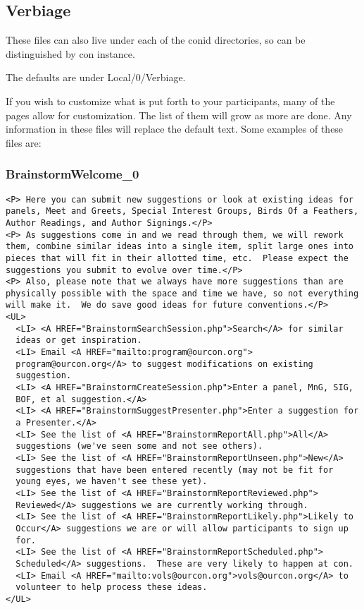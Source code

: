 \documentclass[captions=tablesignature]{scrartcl}
\begin{document}
\subsection{Verbiage}
\label{sec-3-7}
These files can also live under each of the conid directories, so
can be distinguished by con instance.

The defaults are under Local/0/Verbiage.

If you wish to customize what is put forth to your participants,
many of the pages allow for customization.  The list of them will
grow as more are done.  Any information in these files will
replace the default text.  Some examples of these files are:
\subsubsection{BrainstormWelcome\_0}
\label{sec-3-7-1}
\begin{verbatim}
<P> Here you can submit new suggestions or look at existing ideas for
panels, Meet and Greets, Special Interest Groups, Birds Of a Feathers,
Author Readings, and Author Signings.</P>
<P> As suggestions come in and we read through them, we will rework
them, combine similar ideas into a single item, split large ones into
pieces that will fit in their allotted time, etc.  Please expect the
suggestions you submit to evolve over time.</P>
<P> Also, please note that we always have more suggestions than are
physically possible with the space and time we have, so not everything
will make it.  We do save good ideas for future conventions.</P>
<UL>
  <LI> <A HREF="BrainstormSearchSession.php">Search</A> for similar
  ideas or get inspiration.
  <LI> Email <A HREF="mailto:program@ourcon.org">
  program@ourcon.org</A> to suggest modifications on existing
  suggestion.
  <LI> <A HREF="BrainstormCreateSession.php">Enter a panel, MnG, SIG,
  BOF, et al suggestion.</A>
  <LI> <A HREF="BrainstormSuggestPresenter.php">Enter a suggestion for
  a Presenter.</A>
  <LI> See the list of <A HREF="BrainstormReportAll.php">All</A>
  suggestions (we've seen some and not see others).
  <LI> See the list of <A HREF="BrainstormReportUnseen.php">New</A>
  suggestions that have been entered recently (may not be fit for
  young eyes, we haven't see these yet).
  <LI> See the list of <A HREF="BrainstormReportReviewed.php">
  Reviewed</A> suggestions we are currently working through.
  <LI> See the list of <A HREF="BrainstormReportLikely.php">Likely to
  Occur</A> suggestions we are or will allow participants to sign up
  for.
  <LI> See the list of <A HREF="BrainstormReportScheduled.php">
  Scheduled</A> suggestions.  These are very likely to happen at con.
  <LI> Email <A HREF="mailto:vols@ourcon.org">vols@ourcon.org</A> to
  volunteer to help process these ideas.
</UL>
\end{verbatim}
\end{document}
